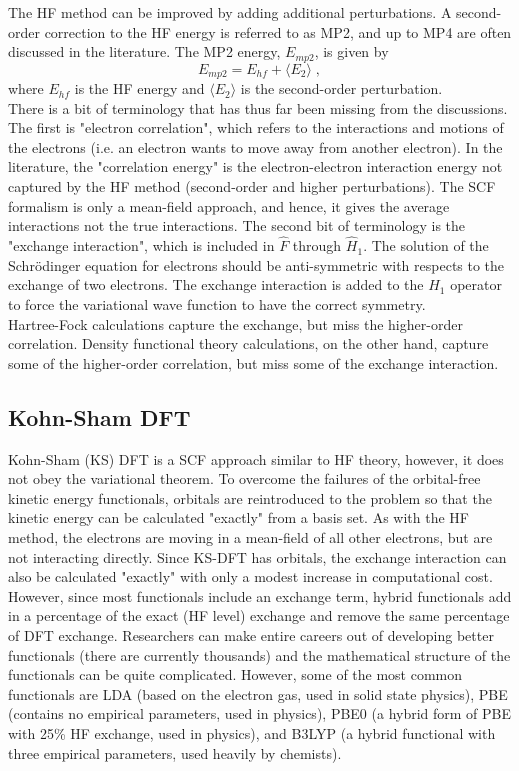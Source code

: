 \documentclass[12pt]{report}
\begin{document}
The HF method can be improved by adding additional perturbations. A
second-order correction to the HF energy is referred to as MP2, and up to
MP4 are often discussed in the literature. The MP2 energy, $E_{mp2}$, is
given by
\begin{equation}
 E_{mp2} = E_{hf} + \langle E_{2} \rangle \; ,
\end{equation}
where $E_{hf}$ is the HF energy and $\langle E_2 \rangle$ is the second-order
perturbation. \\

There is a bit of terminology that has thus far been missing from the
discussions. The first is "electron correlation", which refers to the
interactions and motions of the electrons (i.e. an electron wants to move away
from another electron). In the literature, the "correlation energy" is
the electron-electron interaction energy not captured by the HF method
(second-order and higher perturbations). The SCF formalism is only a
mean-field approach, and hence, it gives the average interactions not the true
interactions. The second bit of terminology is the "exchange interaction",
which is included in $\hat F$ through $\hat H_1$. The solution of the
Schr\"{o}dinger equation for electrons should be anti-symmetric with respects
to the exchange of two electrons. The exchange interaction is added to the
$\hat H_1$ operator to force the variational wave function to have the correct
symmetry. \\

Hartree-Fock calculations capture the exchange, but miss the higher-order
correlation. Density functional theory calculations, on the other hand,
capture some of the higher-order correlation, but miss some of the exchange
interaction.

\subsection{Kohn-Sham DFT}

Kohn-Sham (KS) DFT is a SCF approach similar to HF theory, however, it does
not obey the variational theorem. To overcome the failures of the orbital-free
kinetic energy functionals, orbitals are reintroduced to the problem so that
the kinetic energy can be calculated "exactly" from a basis set. As with the
HF method, the electrons are moving in a mean-field of all other electrons,
but are not interacting directly. Since KS-DFT has orbitals, the exchange
interaction can also be calculated "exactly" with only a modest increase in
computational cost. However, since most functionals include an exchange term,
hybrid functionals add in a percentage of the exact (HF level) exchange and
remove the same percentage of DFT exchange. Researchers can make entire
careers out of developing better functionals (there are currently thousands)
and the mathematical structure of the functionals can be quite complicated.
However, some of the most common functionals are LDA (based on the electron
gas, used in solid state physics), PBE (contains no empirical parameters, used
in physics), PBE0 (a hybrid form of PBE with 25\% HF exchange, used in
physics), and B3LYP (a hybrid functional with three empirical parameters, used
heavily by chemists).
\end{document}

